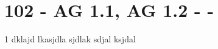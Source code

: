 \section{102 - AG 1.1, AG 1.2 -  - }

\begin{langesbeispiel} \item[1] %
dklajd lkasjdla sjdlak sdjal ksjdal
\end{langesbeispiel}